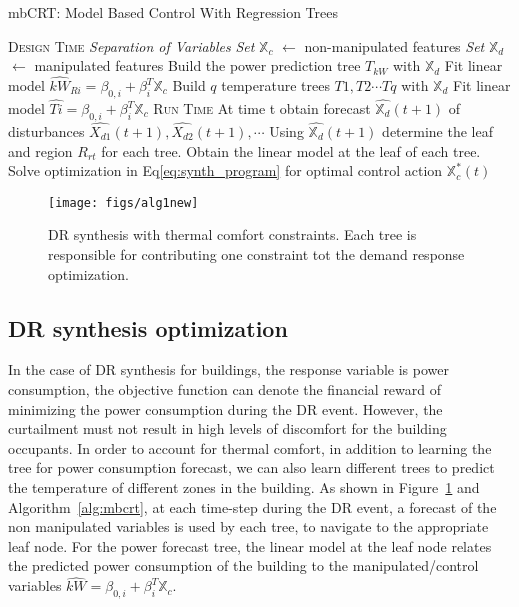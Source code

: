 \documentclass{sig-alternate-ipsn13}
\theoremstyle{definition}
\begin{document}
\small
\begin{algorithm}
\caption{mbCRT: Model Based Control With Regression Trees}\label{alg:mbcrt}
\begin{algorithmic}[1]
\State \textsc{Design Time}
\State \textit{Separation of Variables}
\State \textit{Set} $\mathbb{X}_c$ $\gets$ non-manipulated features
\State \textit{Set} $\mathbb{X}_d$ $\gets$ manipulated features
\State Build  the power prediction tree $T_{kW}$ with $\mathbb{X}_d$
\State Fit linear model $\hat{kW}_{Ri} = \beta_{0,i} + \beta^T_i \mathbb{X}_c$
\State Build $q$ temperature trees $T1,T2 \cdots Tq$ with $\mathbb{X}_d$
\EndFor
{}
\State Fit linear model $\hat{Ti} = \beta_{0,i} + \beta^T_i \mathbb{X}_c$
\EndFor
\EndProcedure
\State \textsc{Run Time}
\State At time t obtain forecast $\hat{\mathbb{X}_d}(t+1)$ of disturbances $\hat{X_{d1}}(t+1), \hat{X_{d2}}(t+1),\cdots$
\State Using $\hat{\mathbb{X}_d}(t+1)$ determine the leaf and region $R_{rt}$ for each tree.
\State Obtain the linear model at the leaf of each tree.
\State Solve optimization in Eq\ref{eq:synth_program} for optimal control action $\mathbb{X}^*_c(t)$
\EndProcedure
\end{algorithmic}
\end{algorithm}
\normalsize

\begin{figure}
\centering
\texttt{[image: figs/alg1new]}
\caption{DR synthesis with thermal comfort constraints. Each tree is responsible for contributing one constraint tot the demand response optimization.}
\label{fig:dropt}
 \vspace{-5pt}
\end{figure}

\subsection{DR synthesis optimization}
In the case of DR synthesis for buildings, the response variable is power consumption, the objective function can denote the financial reward of minimizing the power consumption during the DR event. However, the curtailment must not result in high levels of discomfort for the building occupants. In order to account for thermal comfort, in addition to learning the tree for power consumption forecast, we can also learn different trees to predict the temperature of different zones in the building. As shown in Figure~\ref{fig:dropt} and Algorithm~\ref{alg:mbcrt}, at each time-step during the DR event, a forecast of the non manipulated variables is used by each tree, to navigate to the appropriate leaf node. For the power forecast tree, the linear model at the leaf node relates the predicted power consumption of the building to the manipulated/control variables \ie $\hat{kW} = \beta_{0,i} + \beta^T_i \mathbb{X}_c$.
\end{document}
